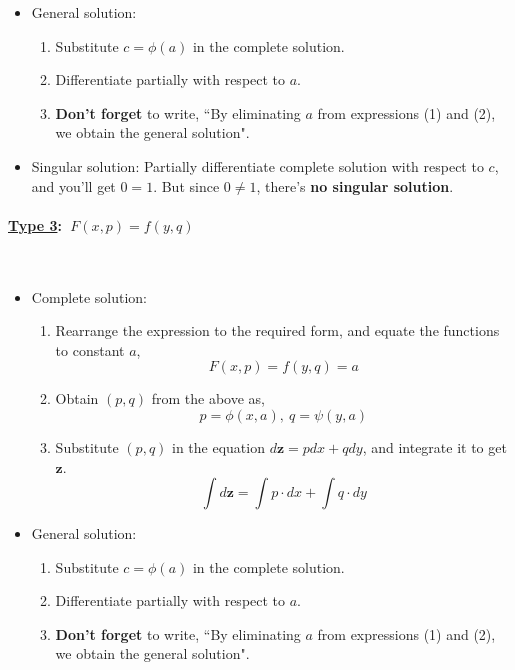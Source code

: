 \documentclass{article}
\newcommand{\para}[1]{\paragraph{#1}\mbox{}\\}
\begin{document}
{\begin{itemize}
\begin{enumerate}[1)]
\\
\item Substitute the ``new" $p,q$ in {\LARGE $F(\textbf{z},p,q)=0$}.
\newpage
\item Rearrange the equation (variable-separable method), and integrate it with the respective $(u,\textbf{z})$, to get the corresponding $f(u,\textbf{z})$.
\item Substitute {\LARGE $u=x+ay$} in the equation, and rearrange it, to obtain the complete solution in the form {\LARGE $\textbf{z}=f(x,y)\\ $}
\end{enumerate}
\item General solution:
\begin{enumerate}[1)]
\item Substitute {\LARGE $c=\phi(a)$} in the complete solution.
\item Differentiate partially with respect to $a$.
\item \textbf{Don't forget} to write, ``By eliminating {\LARGE $a$} from expressions (1) and (2), we obtain the general solution".
\end{enumerate}
\item Singular solution:
Partially differentiate complete solution with respect to {\LARGE $c$}, and you'll get {\LARGE $0=1$}. But since {\LARGE $0\neq 1$}, there's \textbf{no singular solution}.
\end{itemize}
\para{{\Large \underline{Type 3}: {\LARGE $\ F(x,p)=f(y,q)$}}}
\begin{itemize}
\item Complete solution:
\begin{enumerate}[1)]
\item Rearrange the expression to the required form, and equate the functions to constant {\LARGE $a$}, {\LARGE $$F(x,p)=f(y,q)=a$$}
\item Obtain $(p,q)$ from the above as, {\LARGE $$p=\phi(x,a),\ q=\psi(y,a)$$}
\item Substitute $(p,q)$ in the equation $d\textbf{z}=pdx+qdy$, and integrate it to get $\textbf{z}$. {\LARGE $$\int d\textbf{z}=\int p\cdot dx+\int q\cdot dy$$}
\end{enumerate}
\item General solution:
\begin{enumerate}[1)]
\item Substitute {\LARGE $c=\phi(a)$} in the complete solution.
\item Differentiate partially with respect to $a$.
\item \textbf{Don't forget} to write, ``By eliminating {\LARGE $a$} from expressions (1) and (2), we obtain the general solution".

\end{enumerate}
\end{itemize}}
\end{document}
